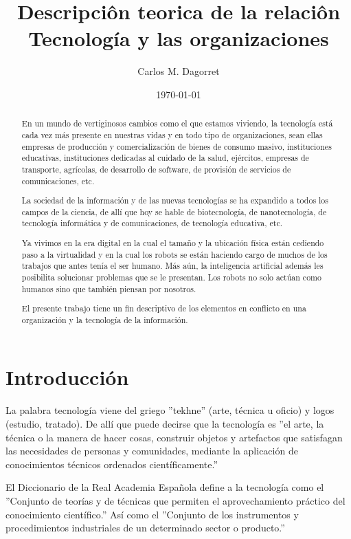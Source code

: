 \documentclass[a4paper, 12pt]{article}
\title{Descripciôn teorica de la relaciôn Tecnología y las organizaciones}
\author{Carlos M. Dagorret}
\date{\today}
\begin{document}
\maketitle

\begin{abstract}
En un mundo de vertiginosos cambios como el que estamos viviendo, la tecnología está cada vez más presente en nuestras vidas y en todo tipo de organizaciones, sean ellas empresas de producción y comercialización de bienes de consumo masivo, instituciones educativas, instituciones dedicadas al cuidado de la salud, ejércitos, empresas de transporte, agrícolas, de desarrollo de software, de provisión de servicios de comunicaciones, etc.

La sociedad de la información y de las nuevas tecnologías se ha expandido a todos los campos de la ciencia, de allí que hoy se hable de biotecnología, de nanotecnología, de tecnología informática y de comunicaciones, de tecnología educativa, etc.

Ya vivimos en la era digital en la cual el tamaño y la ubicación física están cediendo paso a la virtualidad y en la cual los robots se están haciendo cargo de muchos de los trabajos que antes tenía el ser humano. Más aún, la inteligencia artificial además les posibilita solucionar problemas que se le presentan. Los robots no solo actúan como humanos sino que también piensan por nosotros.

El presente trabajo tiene un fin descriptivo de los elementos en conflicto en una organización y la tecnología de la información.
\end{abstract}

\section{Introducción}
\label{sec:Introduccion}

La palabra tecnología viene del griego ''tekhne'' (arte, técnica u oficio) y logos (estudio, tratado). De allí que puede decirse que la tecnología es ''el arte, la técnica o la manera de hacer cosas, construir objetos y artefactos que satisfagan las necesidades de personas y comunidades, mediante la aplicación de conocimientos técnicos ordenados científicamente.''

El Diccionario de la Real Academia Española define a la tecnología como el ''Conjunto de teorías y de técnicas que permiten el aprovechamiento práctico del conocimiento científico.'' Así como el ''Conjunto de los instrumentos y procedimientos industriales de un determinado sector o producto.''
\end{document}
